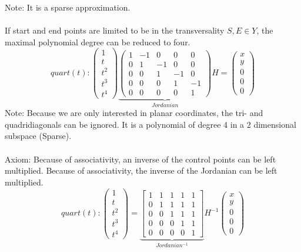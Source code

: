 \documentclass[a4paper,portrait]{report}
\begin{document}
Note: It is a sparse approximation.\\\\
If start and end points are limited to be in the transversality $S,E \in Y$, the maximal polynomial degree can be reduced to four.
\begin{equation}
quart(t):
\begin{pmatrix}
1 \\ t \\ t^2 \\ t^3 \\ t^4
\end{pmatrix}
\underbrace{\begin{pmatrix}
1 & -1 & 0 & 0 & 0\\
0 & 1 & -1 & 0 & 0\\
0 & 0 &1 & -1 & 0\\
0 & 0 & 0 & 1 & -1\\
0 & 0 & 0 & 0 & 1
\end{pmatrix}}_{Jordanian}
H
=
\begin{pmatrix}
x \\ y \\ 0 \\ 0 \\ 0
\end{pmatrix}
\end{equation}
Note: Because we are only interested in planar coordinates, the tri- and quadridiagonals can be ignored. It is a polynomial of degree 4 in a 2 dimensional subspace (Sparse).\\\\
Axiom: Because of associativity, an inverse of the control points can be left multiplied. Because of associativity, the inverse of the Jordanian can be left multiplied.
\begin{equation}
quart(t):
\begin{pmatrix}
1 \\ t \\ t^2 \\ t^3 \\ t^4
\end{pmatrix}
=
\underbrace{\begin{bmatrix}
1 & 1 & 1 & 1 & 1\\
0 & 1 & 1 & 1 & 1\\
0 & 0 & 1 & 1 & 1\\
0 & 0 & 0 & 1 & 1\\
0 & 0 & 0 & 0 & 1
\end{bmatrix}}_{Jordanian^{-1}}
H^{-1}
\begin{pmatrix}
x \\ y \\ 0 \\ 0 \\ 0
\end{pmatrix}
\end{equation}
\end{document}

